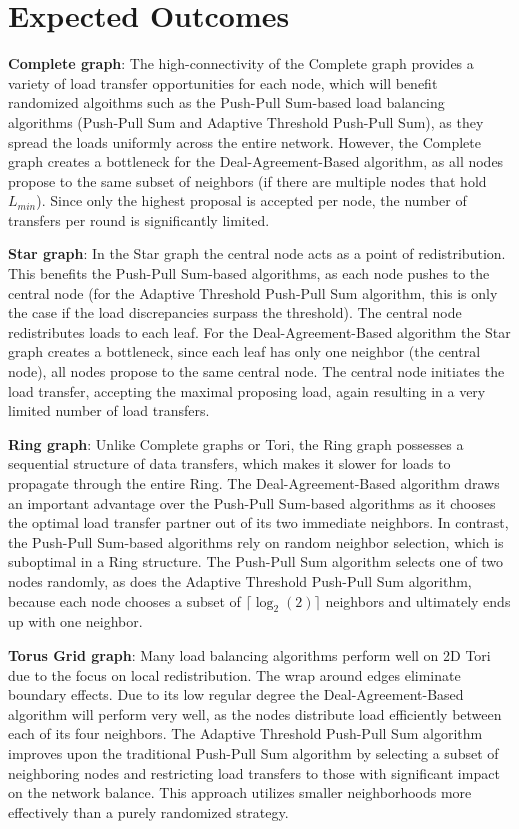 \section{Expected Outcomes}\label{sec:expectedoutcome}
\textbf{Complete graph}: The high-connectivity of the Complete graph provides a variety of load transfer opportunities for each node, which will benefit randomized algoithms such as the Push-Pull Sum-based load balancing algorithms (Push-Pull Sum and Adaptive Threshold Push-Pull Sum), as they spread the loads uniformly across the entire network. However, the Complete graph creates a bottleneck for the Deal-Agreement-Based algorithm, as all nodes propose to the same subset of neighbors (if there are multiple nodes that hold $L_{min}$). Since only the highest proposal is accepted per node, the number of transfers per round is significantly limited.

\textbf{Star graph}: In the Star graph the central node acts as a point of redistribution. This benefits the Push-Pull Sum-based algorithms, as each node pushes to the central node (for the Adaptive Threshold Push-Pull Sum algorithm, this is only the case if the load discrepancies surpass the threshold). The central node redistributes loads to each leaf. For the Deal-Agreement-Based algorithm the Star graph creates a bottleneck, since each leaf has only one neighbor (the central node), all nodes propose to the same central node. The central node initiates the load transfer, accepting the maximal proposing load, again resulting in a very limited number of load transfers.

\textbf{Ring graph}: Unlike Complete graphs or Tori, the Ring graph possesses a sequential structure of data transfers, which makes it slower for loads to propagate through the entire Ring. The Deal-Agreement-Based algorithm draws an important advantage over the Push-Pull Sum-based algorithms as it chooses the optimal load transfer partner out of its two immediate neighbors. In contrast, the Push-Pull Sum-based algorithms rely on random neighbor selection, which is suboptimal in a Ring structure. The Push-Pull Sum algorithm selects one of two nodes randomly, as does the Adaptive Threshold Push-Pull Sum algorithm, because each node chooses a subset of $\lceil \log_{2}{(2)} \rceil$ neighbors and ultimately ends up with one neighbor.

\textbf{Torus Grid graph}: Many load balancing algorithms perform well on 2D Tori due to the focus on local redistribution. The wrap around edges eliminate boundary effects. Due to its low regular degree the Deal-Agreement-Based algorithm will perform very well, as the nodes distribute load efficiently between each of its four neighbors. The Adaptive Threshold Push-Pull Sum algorithm improves upon the traditional Push-Pull Sum algorithm by selecting a subset of neighboring nodes and restricting load transfers to those with significant impact on the network balance. This approach utilizes smaller neighborhoods more effectively than a purely randomized strategy.

